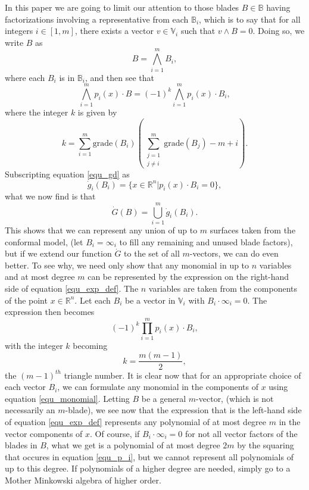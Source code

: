 \documentclass{ecgd-l}
\theoremstyle{definition}
\theoremstyle{remark}
\numberwithin{equation}{section}
\newcommand{\R}{\mathbb{R}}
\newcommand{\B}{\mathbb{B}}
\newcommand{\V}{\mathbb{V}}
\newcommand{\gd}{\dot{g}}
\newcommand{\Gd}{\dot{G}}
\newcommand{\nvai}{\infty}
\newcommand{\grade}{\mbox{grade}}
\begin{document}
In this paper we are going to limit our attention
to those blades $B\in\B$ having factorizations involving a representative from each $\B_i$,
which is to say that for all integers $i\in[1,m]$, there exists a vector $v\in\V_i$ such that $v\wedge B=0$.
Doing so, we write $B$ as
\begin{equation}\label{equ_B_factored}
B = \bigwedge_{i=1}^m B_i,
\end{equation}
where each $B_i$ is in $\B_i$, and then see that
\begin{equation}\label{equ_exp_def}
\bigwedge_{i=1}^m p_i(x)\cdot B = (-1)^k\bigwedge_{i=1}^m p_i(x)\cdot B_i,
\end{equation}
where the integer $k$ is given by
\begin{equation}\label{equ_k}
k=\sum_{i=1}^m \grade(B_i)\left(\sum_{\substack{j=1\\j\neq i}}^m \grade(B_j)-m+i\right).
\end{equation}
Subscripting equation \eqref{equ_gd} as
\begin{equation*}
\gd_i(B_i) = \{x\in\R^n|p_i(x)\cdot B_i=0\},
\end{equation*}
what we now find is that
\begin{equation*}
\Gd(B) = \bigcup_{i=1}^m\gd_i(B_i).
\end{equation*}
This shows that we can represent any union of up to $m$ surfaces taken from the conformal model,
(let $B_i=\nvai_i$ to fill any remaining and unused blade factors),
but if we extend our function $\Gd$ to the set of all $m$-vectors, we can do even better.
To see why, we need only show that any monomial in up to $n$ variables and at most
degree $m$ can be represented by the expression on the right-hand side of equation \eqref{equ_exp_def}.
The $n$ variables are taken from the components of the point $x\in\R^n$.  Let each $B_i$ be a vector in $\V_i$
with $B_i\cdot\nvai_i=0$.
The expression then becomes
\begin{equation}\label{equ_monomial}
(-1)^k\prod_{i=1}^m p_i(x)\cdot B_i,
\end{equation}
with the integer $k$ becoming
\begin{equation}\label{equ_tri_numb}
k = \frac{m(m-1)}{2},
\end{equation}
the $(m-1)^{th}$ triangle number.
It is clear now that for an appropriate choice of each vector $B_i$, we can formulate any
monomial in the components of $x$ using equation \eqref{equ_monomial}.
Letting $B$ be a general $m$-vector, (which is not necessarily an $m$-blade),
we see now that the expression
that is the left-hand side of equation \eqref{equ_exp_def} represents
any polynomial of at most degree $m$
in the vector components of $x$.
Of course, if $B_i\cdot\nvai_i=0$ for not all vector factors of the blades in $B$, what
we get is a polynomial of at most degree $2m$ by the squaring that
occures in equation \eqref{equ_p_i}, but we cannot represent all polynomials
of up to this degree.  If polynomials of a higher degree are needed, simply go to a
Mother Minkowski algebra of higher order.
\end{document}
